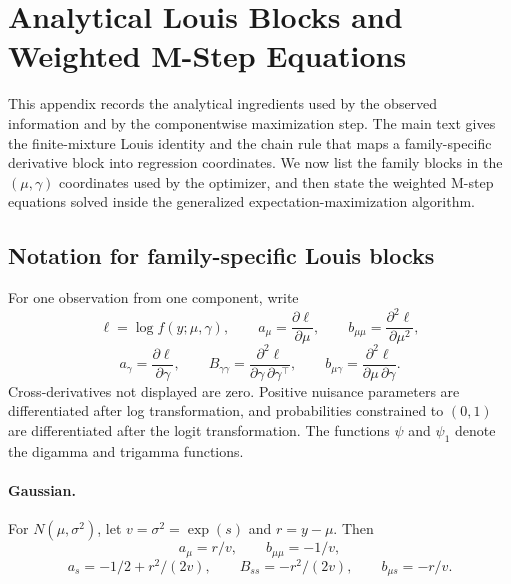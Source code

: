 \appendix

\section{Analytical Louis Blocks and Weighted M-Step Equations}
\label{app:louis_mstep}

This appendix records the analytical ingredients used by the observed
information and by the componentwise maximization step.  The main text gives
the finite-mixture Louis identity and the chain rule that maps a
family-specific derivative block into regression coordinates.  We now list the
family blocks in the \((\mu,\gamma)\) coordinates used by the optimizer, and
then state the weighted M-step equations solved inside the generalized
expectation-maximization algorithm.

\subsection{Notation for family-specific Louis blocks}

For one observation from one component, write
\[
    \ell=\log f(y;\mu,\gamma),\qquad
    a_\mu=\frac{\partial \ell}{\partial\mu},\qquad
    b_{\mu\mu}=\frac{\partial^2\ell}{\partial\mu^2},
\]
\[
    a_\gamma=\frac{\partial\ell}{\partial\gamma},\qquad
    B_{\gamma\gamma}=
    \frac{\partial^2\ell}{\partial\gamma\,\partial\gamma^\top},
    \qquad
    b_{\mu\gamma}=
    \frac{\partial^2\ell}{\partial\mu\,\partial\gamma}.
\]
Cross-derivatives not displayed are zero.  Positive nuisance parameters are
differentiated after log transformation, and probabilities constrained to
\((0,1)\) are differentiated after the logit transformation.  The functions
\(\psi\) and \(\psi_1\) denote the digamma and trigamma functions.

\paragraph{Gaussian.}
For \(N(\mu,\sigma^2)\), let \(v=\sigma^2=\exp(s)\) and \(r=y-\mu\).  Then
\[
    a_\mu=r/v,\qquad b_{\mu\mu}=-1/v,
\]
\[
    a_s=-1/2+r^2/(2v),\qquad
    B_{ss}=-r^2/(2v),\qquad
    b_{\mu s}=-r/v.
\]


